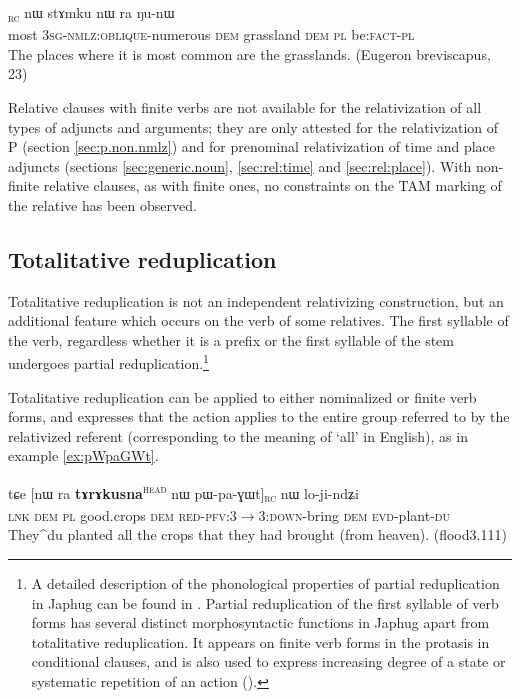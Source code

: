 \documentclass[oldfontcommands,oneside,a4paper,11pt]{article}
\newcommand{\ipa}[1]{{\phon #1}} %
\newcommand{\topic}{\textsc{dem}}
\newcommand{\tete}{\textsuperscript{\textsc{head}}}
\newcommand{\rc}{\textsubscript{\textsc{rc}}}
\begin{document}
\begin{exe}
   \ex \label{ex:WsAdAn}
 \gll  
  [\ipa{stu}   	\ipa{ɯ-sɤ-dɤn}]\rc{}   	\ipa{nɯ}   	\ipa{stɤmku}   	\ipa{nɯ} \ipa{ra}   	\ipa{ŋu-nɯ}   \\
most \textsc{3sg-nmlz:oblique}-numerous \topic{} grassland \topic{} \textsc{pl} be:\textsc{fact}-\textsc{pl} \\
\glt The places where it is most common are the grasslands. (Eugeron breviscapus, 23)
    \end{exe}
    

	  
	Relative clauses with finite verbs are not available for the relativization of all types of adjuncts and arguments; they are only attested for the relativization of P (section \ref{sec:p.non.nmlz}) and for prenominal relativization of time and place adjuncts (sections \ref{sec:generic.noun}, \ref{sec:rel:time} and \ref{sec:rel:place}). With non-finite relative clauses, as with finite ones, no constraints on the TAM marking of the relative has been observed. 
	

	
\subsection{Totalitative reduplication} \label{sec:redp}
Totalitative reduplication is not an independent relativizing construction, but an additional feature which occurs on the verb of some relatives. The first syllable of the verb, regardless whether it is a prefix or the first syllable of the stem undergoes partial reduplication.\footnote{A detailed description of the phonological properties of partial reduplication in Japhug   can be found in \citet{jacques04these, jacques07redupl}. Partial reduplication of the first syllable of   verb forms has several distinct morphosyntactic functions in Japhug apart from totalitative reduplication. It appears on  finite verb forms in the protasis in conditional clauses, and is also used to express increasing degree of a state or systematic repetition of an action (\citealt{jacques07redupl}).}


Totalitative reduplication  can be applied to either nominalized or finite verb forms, and expresses that the action applies to the entire group referred to by the relativized referent (corresponding to the meaning of `all' in English), as in example \ref{ex:pWpaGWt}.

  \begin{exe}
\ex \label{ex:pWpaGWt}
\gll
\ipa{tɕe}  	[\ipa{nɯ} \ipa{ra}  	\textbf{\ipa{tɤrɤkusna}}\tete{}  	\ipa{nɯ}  	\ipa{pɯ-pa-ɣɯt}]\rc{}  	\ipa{nɯ}  	\ipa{lo-ji-ndʑi}  \\
\textsc{lnk} \textsc{dem} \textsc{pl} good.crops \topic{} \textsc{red-pfv:3$\rightarrow$3:down}-bring \topic{} \textsc{evd}-plant-\textsc{du} \\
\glt They^{du} planted all the crops that they had brought (from heaven). (flood3.111)
\end{exe}
 
\end{document}
